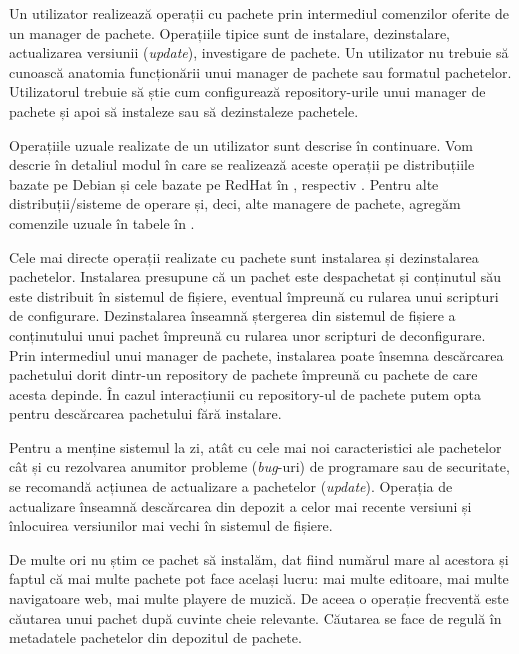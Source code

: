 Un utilizator realizează operații cu pachete prin intermediul comenzilor oferite de un manager de pachete. Operațiile tipice sunt de instalare, dezinstalare, actualizarea versiunii (\textit{update}), investigare de pachete. Un utilizator nu trebuie să cunoască anatomia funcționării unui manager de pachete sau formatul pachetelor. Utilizatorul trebuie să știe cum configurează repository-urile unui manager de pachete și apoi să instaleze sau să dezinstaleze pachetele.

Operațiile uzuale realizate de un utilizator sunt descrise în continuare. Vom descrie în detaliul modul în care se realizează aceste operații pe distribuțiile bazate pe Debian și cele bazate pe RedHat în , respectiv . Pentru alte distribuții/sisteme de operare și, deci, alte managere de pachete, agregăm comenzile uzuale în tabele în .

Cele mai directe operații realizate cu pachete sunt instalarea și dezinstalarea pachetelor. Instalarea presupune că un pachet este despachetat și conținutul său este distribuit în sistemul de fișiere, eventual împreună cu rularea unui scripturi de configurare. Dezinstalarea înseamnă ștergerea din sistemul de fișiere a conținutului unui pachet împreună cu rularea unor scripturi de deconfigurare. Prin intermediul unui manager de pachete, instalarea poate însemna descărcarea pachetului dorit dintr-un repository de pachete împreună cu pachete de care acesta depinde. În cazul interacțiunii cu repository-ul de pachete putem opta pentru descărcarea pachetului fără instalare.

Pentru a menține sistemul la zi, atât cu cele mai noi caracteristici ale pachetelor cât și cu rezolvarea anumitor probleme (\textit{bug}-uri) de programare sau de securitate, se recomandă acțiunea de actualizare a pachetelor (\textit{update}). Operația de actualizare înseamnă descărcarea din depozit a celor mai recente versiuni și înlocuirea versiunilor mai vechi în sistemul de fișiere.

De multe ori nu știm ce pachet să instalăm, dat fiind numărul mare al acestora și faptul că mai multe pachete pot face același lucru: mai multe editoare, mai multe navigatoare web, mai multe playere de muzică. De aceea o operație frecventă este căutarea unui pachet după cuvinte cheie relevante. Căutarea se face de regulă în metadatele pachetelor din depozitul de pachete.

